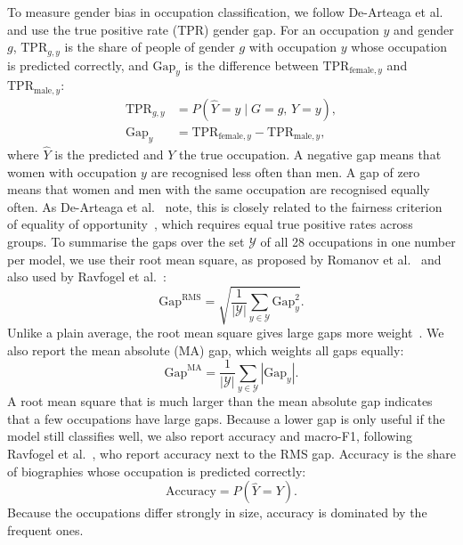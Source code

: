 \documentclass[sigconf]{acmart}
\begin{document}
To measure gender bias in occupation classification, we follow De-Arteaga et al.~\cite{dearteaga2019bios} and use the true positive rate (TPR) gender gap.
For an occupation $y$ and gender $g$, $\mathrm{TPR}_{g,y}$ is the share of people of gender $g$ with occupation $y$ whose occupation is predicted correctly, and $\mathrm{Gap}_y$ is the difference between $\mathrm{TPR}_{\mathrm{female},y}$ and $\mathrm{TPR}_{\mathrm{male},y}$:
\begin{align}
  \mathrm{TPR}_{g,y} &= P(\hat{Y} = y \mid G = g,\, Y = y), \\
  \mathrm{Gap}_y &= \mathrm{TPR}_{\mathrm{female},y} - \mathrm{TPR}_{\mathrm{male},y},
\end{align}
where $\hat{Y}$ is the predicted and $Y$ the true occupation.
A negative gap means that women with occupation $y$ are recognised less often than men.
A gap of zero means that women and men with the same occupation are recognised equally often. As De-Arteaga et al.~\cite{dearteaga2019bios} note, this is closely related to the fairness criterion of equality of opportunity~\cite{hardt2016equality}, which requires equal true positive rates across groups.
To summarise the gaps over the set $\mathcal{Y}$ of all 28 occupations in one number per model, we use their root mean square, as proposed by Romanov et al.~\cite{romanov2019name} and also used by Ravfogel et al.~\cite{ravfogel2020null}:
\begin{equation}
  \mathrm{Gap}^{\mathrm{RMS}} = \sqrt{\frac{1}{|\mathcal{Y}|}\sum_{y \in \mathcal{Y}} \mathrm{Gap}_y^{2}}.
\end{equation}
Unlike a plain average, the root mean square gives large gaps more weight~\cite{romanov2019name}.
We also report the mean absolute (MA) gap, which weights all gaps equally:
\begin{equation}
  \mathrm{Gap}^{\mathrm{MA}} = \frac{1}{|\mathcal{Y}|}\sum_{y \in \mathcal{Y}} \left|\mathrm{Gap}_y\right|.
\end{equation}
A root mean square that is much larger than the mean absolute gap indicates that a few occupations have large gaps.
Because a lower gap is only useful if the model still classifies well, we also report accuracy and macro-F1, following Ravfogel et al.~\cite{ravfogel2020null}, who report accuracy next to the RMS gap.
Accuracy is the share of biographies whose occupation is predicted correctly:
\begin{equation}
  \mathrm{Accuracy} = P(\hat{Y} = Y).
\end{equation}
Because the occupations differ strongly in size, accuracy is dominated by the frequent ones.
\end{document}
